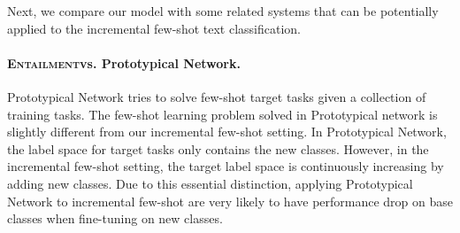 \documentclass[11pt]{article}
\newcommand{\modelname}{\textsc{Entailment}}
\begin{document}
Next, we compare our model with some related systems that can be potentially applied to the incremental few-shot text classification.

\paragraph{\modelname\enspace vs. Prototypical Network.} Prototypical Network \cite{DBLPSnellSZ17} tries to solve few-shot target tasks given a collection of training tasks.
The few-shot learning problem solved in Prototypical network is slightly different from our incremental few-shot setting. In Prototypical Network, the label space for target tasks only contains the new classes. However, in the incremental few-shot setting, the target label space is continuously increasing by adding new classes. Due to this essential distinction, applying Prototypical Network to incremental few-shot are very likely to have performance drop on base classes when fine-tuning on new classes.

\end{document}
